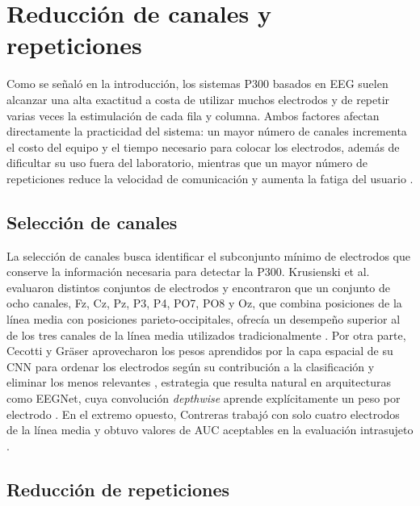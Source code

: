 \section[REDUCCIÓN DE CANALES Y REPETICIONES]{Reducción de canales y repeticiones}

Como se señaló en la introducción, los sistemas P300 basados en EEG suelen alcanzar una alta
exactitud a costa de utilizar muchos electrodos y de repetir varias veces la estimulación de cada
fila y columna. Ambos factores afectan directamente la practicidad del sistema: un mayor número de
canales incrementa el costo del equipo y el tiempo necesario para colocar los electrodos, además de
dificultar su uso fuera del laboratorio, mientras que un mayor número de repeticiones reduce la
velocidad de comunicación y aumenta la fatiga del usuario \cite{krusienski2008,contreras2021}.

\subsection{Selección de canales}

La selección de canales busca identificar el subconjunto mínimo de electrodos que conserve la
información necesaria para detectar la P300. Krusienski et al. evaluaron distintos conjuntos de
electrodos y encontraron que un conjunto de ocho canales, Fz, Cz, Pz, P3, P4, PO7, PO8 y Oz, que
combina posiciones de la línea media con posiciones parieto-occipitales, ofrecía un desempeño
superior al de los tres canales de la línea media utilizados tradicionalmente \cite{krusienski2008}.
Por otra parte, Cecotti y Gräser aprovecharon los pesos aprendidos por la capa espacial de su CNN
para ordenar los electrodos según su contribución a la clasificación y eliminar los menos
relevantes \cite{cecotti2011}, estrategia que resulta natural en arquitecturas como EEGNet, cuya
convolución \textit{depthwise} aprende explícitamente un peso por electrodo \cite{lawhern2018}. En
el extremo opuesto, Contreras trabajó con solo cuatro electrodos de la línea media y obtuvo valores
de AUC aceptables en la evaluación intrasujeto \cite{contreras2021}.

\subsection{Reducción de repeticiones}

